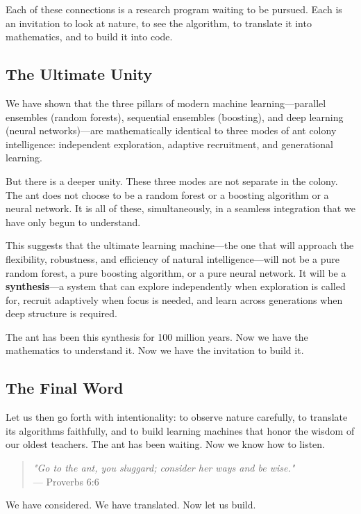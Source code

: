 \documentclass[12pt,letterpaper]{article}
\begin{document}
Each of these connections is a research program waiting to be pursued. Each is an invitation to look at nature, to see the algorithm, to translate it into mathematics, and to build it into code.

\subsection*{The Ultimate Unity}

We have shown that the three pillars of modern machine learning—parallel ensembles (random forests), sequential ensembles (boosting), and deep learning (neural networks)—are mathematically identical to three modes of ant colony intelligence: independent exploration, adaptive recruitment, and generational learning.

But there is a deeper unity. These three modes are not separate in the colony. The ant does not choose to be a random forest or a boosting algorithm or a neural network. It is all of these, simultaneously, in a seamless integration that we have only begun to understand.

This suggests that the ultimate learning machine—the one that will approach the flexibility, robustness, and efficiency of natural intelligence—will not be a pure random forest, a pure boosting algorithm, or a pure neural network. It will be a \textbf{synthesis}—a system that can explore independently when exploration is called for, recruit adaptively when focus is needed, and learn across generations when deep structure is required.

The ant has been this synthesis for 100 million years. Now we have the mathematics to understand it. Now we have the invitation to build it.

\subsection*{The Final Word}

Let us then go forth with intentionality: to observe nature carefully, to translate its algorithms faithfully, and to build learning machines that honor the wisdom of our oldest teachers. The ant has been waiting. Now we know how to listen.

\begin{quote}
\Large
\textit{"Go to the ant, you sluggard; consider her ways and be wise."} \\
— Proverbs 6:6
\end{quote}

We have considered. We have translated. Now let us build.
\end{document}
